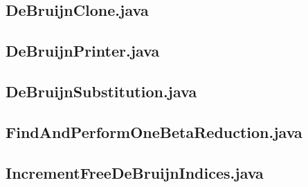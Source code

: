 \documentclass{article}
\begin{document}
\subsection{DeBruijnClone.java}


\subsection{DeBruijnPrinter.java}


\subsection{DeBruijnSubstitution.java}


\subsection{FindAndPerformOneBetaReduction.java}


\subsection{IncrementFreeDeBruijnIndices.java}

\end{document}
